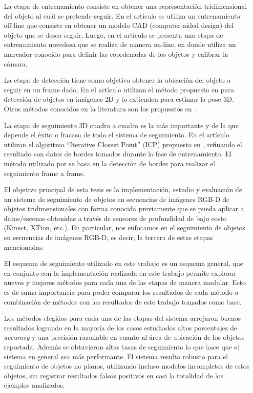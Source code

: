 La etapa de entrenamiento consiste en obtener una representación tridimensional del objeto al cuál se pretende seguir. En el artículo \cite{drummond1999real} se utiliza un entrenamiento off-line que consiste en obtener un modelo CAD (computer-aided design) del objeto que se desea seguir. Luego, en el artículo \cite{park2011texture} se presenta una etapa de entrenamiento novedosa que se realiza de manera on-line, en donde utiliza un marcador conocido para definir las coordenadas de los objetos y calibrar la cámara.

La etapa de detección tiene como objetivo obtener la ubicación del objeto a seguir en un frame dado. En el artículo \cite{park2011texture} utilizan el método propuesto en \cite{hinterstoisser2010dominant} para detección de objetos en imágenes 2D y lo extienden para estimar la pose 3D. Otros métodos conocidos en la literatura son los propuestos en \cite{brunelli2009template,korman13fast}.

La etapa de seguimiento 3D cuadro a cuadro es la más importante y de la que depende el éxito o fracaso de todo el sistema de seguimiento. En el artículo \cite{park2011texture} utilizan el algoritmo ``Iterative Closest Point'' (ICP) propuesto en \cite{zhang94icp,besl92icp}, refinando el resultado con datos de bordes tomados durante la fase de entrenamiento. El método utilizado por \cite{drummond1999real} se basa en la detección de bordes para realizar el seguimiento frame a frame.

El objetivo principal de esta tesis es la implementación, estudio y evaluación de un sistema de seguimiento de objetos en secuencias de imágenes RGB-D de objetos tridimensionales con forma conocida previamente que se pueda aplicar a datos/escenas obtenidas a través de sensores de profundidad de bajo costo (Kinect, XTion, etc.). En particular, nos enfocamos en el seguimiento de objetos en secuencias de imágenes RGB-D, es decir, la tercera de estas etapas mencionadas.

El esquema de seguimiento utilizado en este trabajo es un esquema general, que en conjunto con la implementación realizada en este trabajo permite explorar nuevos y mejores métodos para cada una de las etapas de manera modular. Esto es de suma importancia para poder comparar los resultados de cada método o combinación de métodos con los resultados de este trabajo tomados como base.

Los métodos elegidos para cada una de las etapas del sistema arrojaron buenos resultados logrando en la mayoría de los casos estudiados altos porcentajes de \textit{accuracy} y una precisión razonable en cuanto al área de ubicación de los objetos reportada. Además se obtuvieron altas tasas de seguimiento lo que hace que el sistema en general sea más performante. El sistema resulta robusto para el seguimiento de objetos no planos, utilizando incluso modelos incompletos de estos objetos, sin registrar resultados falsos positivos en casi la totalidad de los ejemplos analizados.

